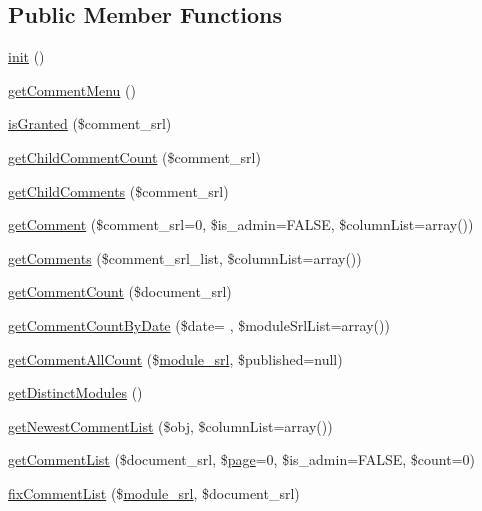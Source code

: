 \subsection*{Public Member Functions}
\begin{DoxyCompactItemize}
\item 
\hyperlink{classcommentModel_a4da59f10ea425e61dbd5bebe73ab9ec1}{init} ()
\item 
\hyperlink{classcommentModel_a74e52809b658711e8d63ba7900eb5246}{get\+Comment\+Menu} ()
\item 
\hyperlink{classcommentModel_aff0bb9049c29d3795fbe2c7eb92a2451}{is\+Granted} (\$comment\+\_\+srl)
\item 
\hyperlink{classcommentModel_adfb890eecf72a039c9f7a28c1e6eb3d2}{get\+Child\+Comment\+Count} (\$comment\+\_\+srl)
\item 
\hyperlink{classcommentModel_ac1acb7d6d8da68e20ec5e6e5a55e5d32}{get\+Child\+Comments} (\$comment\+\_\+srl)
\item 
\hyperlink{classcommentModel_adc900f3123da26b591a20ca7a951e4ac}{get\+Comment} (\$comment\+\_\+srl=0, \$is\+\_\+admin=F\+A\+L\+S\+E, \$column\+List=array())
\item 
\hyperlink{classcommentModel_a435e77a0e774c5b6ba899312e8bea2dd}{get\+Comments} (\$comment\+\_\+srl\+\_\+list, \$column\+List=array())
\item 
\hyperlink{classcommentModel_af28e4e312fad244148fd96bd0e8f0b5f}{get\+Comment\+Count} (\$document\+\_\+srl)
\item 
\hyperlink{classcommentModel_a29b3a6403c25f503f3fb91b4329542ee}{get\+Comment\+Count\+By\+Date} (\$date= \textquotesingle{}\textquotesingle{}, \$module\+Srl\+List=array())
\item 
\hyperlink{classcommentModel_a6d868da113e98ecde6c6e5cb12ce4cbf}{get\+Comment\+All\+Count} (\$\hyperlink{ko_8install_8php_a370bb6450fab1da3e0ed9f484a38b761}{module\+\_\+srl}, \$published=null)
\item 
\hyperlink{classcommentModel_a4f202e4238ab75645a10db6acaa1f969}{get\+Distinct\+Modules} ()
\item 
\hyperlink{classcommentModel_a89492b8f475e42296e1560b8886bdc01}{get\+Newest\+Comment\+List} (\$obj, \$column\+List=array())
\item 
\hyperlink{classcommentModel_ae43f36bfd32d39f87dac358aa1526f7f}{get\+Comment\+List} (\$document\+\_\+srl, \$\hyperlink{classpage}{page}=0, \$is\+\_\+admin=F\+A\+L\+S\+E, \$count=0)
\item 
\hyperlink{classcommentModel_af9457d8f1128af78c79ea416d591fc13}{fix\+Comment\+List} (\$\hyperlink{ko_8install_8php_a370bb6450fab1da3e0ed9f484a38b761}{module\+\_\+srl}, \$document\+\_\+srl)

\end{DoxyCompactItemize}
